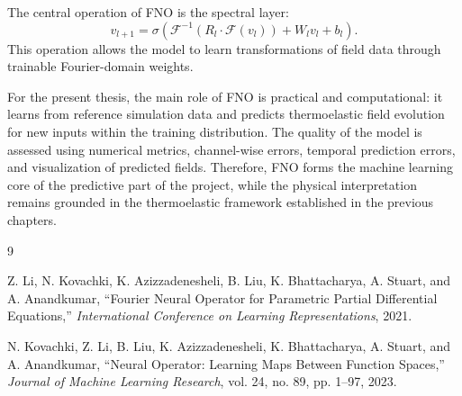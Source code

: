 \documentclass[14pt]{extarticle}
\begin{document}
The central operation of FNO is the spectral layer:
\[
v_{l+1}
=
\sigma
\left(
\mathcal{F}^{-1}
\left(
R_l \cdot \mathcal{F}(v_l)
\right)
+
W_l v_l
+
b_l
\right).
\]
This operation allows the model to learn transformations of field data through trainable Fourier-domain weights.

For the present thesis, the main role of FNO is practical and computational: it learns from reference simulation data and predicts thermoelastic field evolution for new inputs within the training distribution. The quality of the model is assessed using numerical metrics, channel-wise errors, temporal prediction errors, and visualization of predicted fields. Therefore, FNO forms the machine learning core of the predictive part of the project, while the physical interpretation remains grounded in the thermoelastic framework established in the previous chapters.


\begin{thebibliography}{9}

Z. Li, N. Kovachki, K. Azizzadenesheli, B. Liu, K. Bhattacharya, A. Stuart, and A. Anandkumar,
``Fourier Neural Operator for Parametric Partial Differential Equations,''
\textit{International Conference on Learning Representations}, 2021.

N. Kovachki, Z. Li, B. Liu, K. Azizzadenesheli, K. Bhattacharya, A. Stuart, and A. Anandkumar,
``Neural Operator: Learning Maps Between Function Spaces,''
\textit{Journal of Machine Learning Research}, vol. 24, no. 89, pp. 1--97, 2023.

\end{thebibliography}
\end{document}
